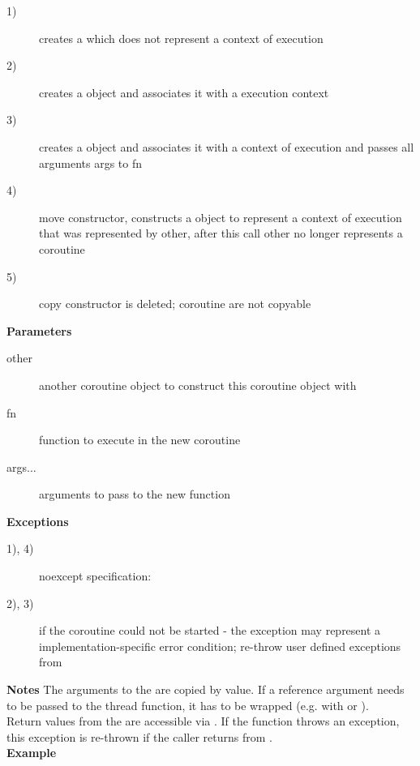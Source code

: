 \begin{description}
    \item[1)] creates a \coro which does not represent a context of execution
    \item[2)] creates a \coro object and associates it with a execution
              context
    \item[3)] creates a \coro object and associates it with a context of
              execution and passes all arguments args to \corofunction fn
    \item[4)] move constructor, constructs a \coro object to represent a
              context of execution that was represented by other, after this
              call other no longer represents a coroutine
    \item[5)] copy constructor is deleted; coroutine are not copyable
\end{description}

{\bf Parameters}
\begin{description}
    \item[other]   another coroutine object to construct this coroutine object with
    \item[fn]      function to execute in the new coroutine
    \item[args...] arguments to pass to the new function
\end{description}

{\bf Exceptions}
\begin{description}
    \item[1), 4)] noexcept specification: 
    \item[2), 3)]  if the coroutine could not be started
                  - the exception may represent a implementation-specific error
                  condition; re-throw user defined exceptions from \corofunction
\end{description}

{\bf Notes}
The arguments to the \corofunction are copied by value. If a reference argument
needs to be passed to the thread function, it has to be wrapped (e.g. with
 or ).\\
\newline
Return values from the \corofunction are accessible via \coroget. If the
function throws an exception, this exception is re-thrown if the caller returns from
\coroop.\\

{\bf Example}

